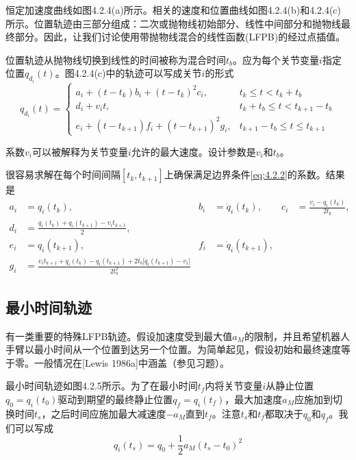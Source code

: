 \documentclass[UTF8]{ctexart}
\theoremstyle{definition}
\begin{document}
恒定加速度曲线如图4.2.4(a)所示。相关的速度和位置曲线如图4.2.4(b)和4.2.4(c)所示。位置轨迹由三部分组成：二次或抛物线初始部分、线性中间部分和抛物线最终部分。因此，让我们讨论使用带抛物线混合的线性函数(LFPB)的经过点插值。

位置轨迹从抛物线切换到线性的时间被称为混合时间$t_b$。应为每个关节变量$i$指定位置$q_{d_i}(t)$。图4.2.4(c)中的轨迹可以写成关节$i$的形式
\begin{equation}\label{eq:4.2.8}
    q_{d_i}(t) = \begin{cases}
        a_i + (t - t_k) b_i + (t - t_k)^2 c_i, & t_k \leq t < t_k + t_b \\
        d_i + v_i t, & t_k + t_b \leq t < t_{k+1} - t_b \\
        e_i + (t - t_{k+1}) f_i + (t - t_{k+1})^2 g_i, & t_{k+1} - t_b \leq t \leq t_{k+1}
    \end{cases}
\end{equation}

系数$v_i$可以被解释为关节变量$i$允许的最大速度。设计参数是$v_i$和$t_b$。

很容易求解在每个时间间隔$[t_k, t_{k+1}]$上确保满足边界条件\eqref{eq:4.2.2}的系数。结果是
\begin{equation}\label{eq:4.2.9}
\begin{aligned}
    a_i &= q_i(t_k), & b_i &= \dot{q}_i(t_k), & c_i &= \frac{v_i - \dot{q}_i(t_k)}{2t_b}, \\
    d_i &= \frac{q_i(t_k) + q_i(t_{k+1}) - v_i t_{k+1}}{2}, \\
    e_i &= q_i(t_{k+1}), & f_i &= \dot{q}_i(t_{k+1}), \\
    g_i &= \frac{v_i t_{k+1} + q_i(t_k) - q_i(t_{k+1}) + 2t_b \bigl[\dot{q}_i(t_{k+1}) - v_i\bigr]}{2t_b^2}
\end{aligned}
\end{equation}

\subsection{最小时间轨迹}

有一类重要的特殊LFPB轨迹。假设加速度受到最大值$a_M$的限制，并且希望机器人手臂以最小时间从一个位置到达另一个位置。为简单起见，假设初始和最终速度等于零。一般情况在[Lewis 1986a]中涵盖（参见习题）。

最小时间轨迹如图4.2.5所示。为了在最小时间$t_f$内将关节变量$i$从静止位置$q_0 = q_i(t_0)$驱动到期望的最终静止位置$q_f = q_i(t_f)$，最大加速度$a_M$应施加到切换时间$t_s$，之后时间应施加最大减速度$-a_M$直到$t_f$。注意$t_s$和$t_f$都取决于$q_0$和$q_f$。我们可以写成
\begin{equation}\label{eq:4.2.10}
    q_i(t_s) = q_0 + \frac{1}{2}a_M(t_s - t_0)^2
\end{equation}
\end{document}
